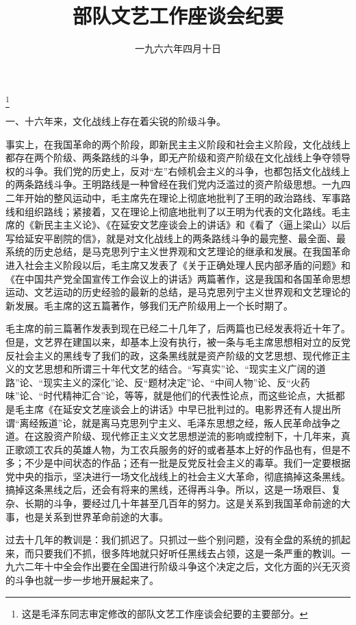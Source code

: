 
\title{部队文艺工作座谈会纪要}
\date{一九六六年四月十日}
\thanks{这是毛泽东同志审定修改的部队文艺工作座谈会纪要的主要部分。}
\maketitle


一、十六年来，文化战线上存在着尖锐的阶级斗争。

事实上，在我国革命的两个阶段，即新民主主义阶段和社会主义阶段，文化战线上都存在两个阶级、两条路线的斗争，即无产阶级和资产阶级在文化战线上争夺领导权的斗争。我们党的历史上，反对“左”右倾机会主义的斗争，也都包括文化战线上的两条路线斗争。王明路线是一种曾经在我们党内泛滥过的资产阶级思想。一九四二年开始的整风运动中，毛主席先在理论上彻底地批判了王明的政治路线、军事路线和组织路线；紧接着，又在理论上彻底地批判了以王明为代表的文化路线。毛主席的《新民主主义论》、《在延安文艺座谈会上的讲话》和《看了〈逼上梁山〉以后写给延安平剧院的信》，就是对文化战线上的两条路线斗争的最完整、最全面、最系统的历史总结，是马克思列宁主义世界观和文艺理论的继承和发展。在我国革命进入社会主义阶段以后，毛主席又发表了《关于正确处理人民内部矛盾的问题》和《在中国共产党全国宣传工作会议上的讲话》两篇著作，这是我国和各国革命思想运动、文艺运动的历史经验的最新的总结，是马克思列宁主义世界观和文艺理论的新发展。毛主席的这五篇著作，够我们无产阶级用上一个长时期了。

毛主席的前三篇著作发表到现在已经二十几年了，后两篇也已经发表将近十年了。但是，文艺界在建国以来，却基本上没有执行，被一条与毛主席思想相对立的反党反社会主义的黑线专了我们的政，这条黑线就是资产阶级的文艺思想、现代修正主义的文艺思想和所谓三十年代文艺的结合。“写真实”论、“现实主义广阔的道路”论、“现实主义的深化”论、反“题材决定”论、“中间人物”论、反“火药味”论、“时代精神汇合”论，等等，就是他们的代表性论点，而这些论点，大抵都是毛主席《在延安文艺座谈会上的讲话》中早已批判过的。电影界还有人提出所谓“离经叛道”论，就是离马克思列宁主义、毛泽东思想之经，叛人民革命战争之道。在这股资产阶级、现代修正主义文艺思想逆流的影响或控制下，十几年来，真正歌颂工农兵的英雄人物，为工农兵服务的好的或者基本上好的作品也有，但是不多；不少是中间状态的作品；还有一批是反党反社会主义的毒草。我们一定要根据党中央的指示，坚决进行一场文化战线上的社会主义大革命，彻底搞掉这条黑线。搞掉这条黑线之后，还会有将来的黑线，还得再斗争。所以，这是一场艰巨、复杂、长期的斗争，要经过几十年甚至几百年的努力。这是关系到我国革命前途的大事，也是关系到世界革命前途的大事。

过去十几年的教训是：我们抓迟了。只抓过一些个别问题，没有全盘的系统的抓起来，而只要我们不抓，很多阵地就只好听任黑线去占领，这是一条严重的教训。一九六二年十中全会作出要在全国进行阶级斗争这个决定之后，文化方面的兴无灭资的斗争也就一步一步地开展起来了。

